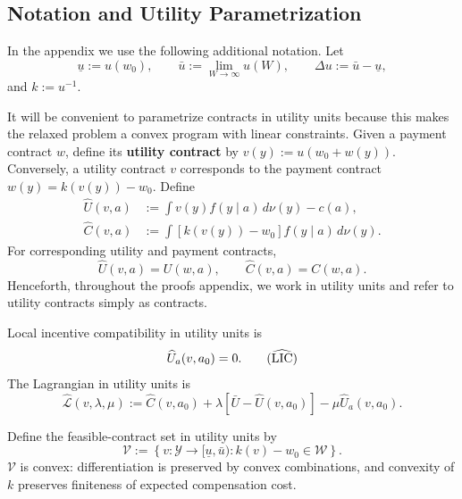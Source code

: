 \newcommand{\Capq}{\mathrm{Cap}}
\newcommand{\Curvq}{\mathrm{Curv}}

\subsection{Notation and Utility Parametrization}
\label{subsec:appendix-notation}

In the appendix we use the following additional notation. Let
\[
    \underline u:=u(w_0),\qquad
    \bar u:=\lim_{W\to\infty}u(W),\qquad
    \Delta u:=\bar u-\underline u,
\]
and $k:=u^{-1}$.

It will be convenient to parametrize contracts in utility units because this
makes the relaxed problem a convex program with linear constraints.  Given a
payment contract $w$, define its \textbf{utility contract} by
$v(y):=u(w_0+w(y))$.  Conversely, a utility contract $v$ corresponds to the
payment contract $w(y)=k(v(y))-w_0$.  Define
\begin{align*}
    \widehat U(v,a)&:=\int v(y)f(y\mid a)\,d\nu(y)-c(a),\\
    \widehat C(v,a)&:=\int [k(v(y))-w_0]f(y\mid a)\,d\nu(y).
\end{align*}
For corresponding utility and payment contracts,
\begin{equation}
    \widehat U(v,a)=U(w,a),
    \qquad
    \widehat C(v,a)=C(w,a).
    \label{eq:utility-payment-equivalence}
\end{equation}
Henceforth, throughout the proofs appendix, we work in utility units and refer
to utility contracts simply as contracts.

Local incentive compatibility in utility units is
\begin{equation}
    \widehat U_a(v,a_0)
    =0.
    \tag{$\widehat{\mathrm{LIC}}$}\label{LIC_hat}
\end{equation}
The Lagrangian in utility units is
\begin{equation}
    \widehat{\mathcal L}(v,\lambda,\mu)
    :=\widehat C(v,a_0)
      +\lambda[\bar U-\widehat U(v,a_0)]
      -\mu\widehat U_a(v,a_0).
    \label{eq:utility-lagrangian}
\end{equation}

Define the feasible-contract set in utility units by
\[
    \mathcal V
    :=\left\{v:\mathcal Y\to[\underline u,\bar u):
    k(v)-w_0\in\mathcal W\right\}.
\]
$\mathcal V$ is convex: differentiation is preserved by convex combinations, and
convexity of $k$ preserves finiteness of expected compensation cost.

